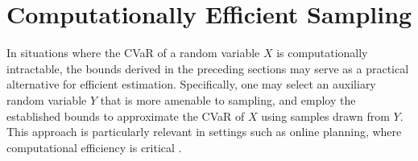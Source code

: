 \documentclass[letterpaper]{article} %
\begin{document}

\section{Computationally Efficient Sampling}
In situations where the CVaR of a random variable $X$ is computationally intractable, the bounds derived in the preceding sections may serve as a practical alternative for efficient estimation. Specifically, one may select an auxiliary random variable $Y$ that is more amenable to sampling, and employ the established bounds to approximate the CVaR of $X$ using samples drawn from $Y$. This approach is particularly relevant in settings such as online planning, where computational efficiency is critical \cite{Lev-Yehudi_Barenboim_Indelman_2024, ijcai2022p637}.
\end{document}
